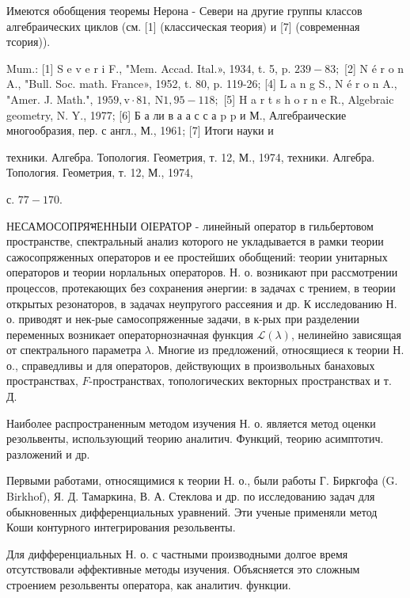 \documentclass[10pt]{article}
\begin{document}
Имеются обобщения теоремы Нерона - Севери на другие группы классов алгебраических циклов (см. [1] (классическая теория) и [7] (современная тсория)).



Mum.: [1] S e v e r i F., "Mem. Accad. Ital.», 1934, t. 5, p. $239-83 ;$ [2] N é r o n A., "Bull. Soc. math. France», 1952, t. 80, p. 119-26; [4] L a n g S., N é r o n A., "Amer. J. Math.", $1959, \mathrm{v} \cdot 81, \mathrm{~N} 1,95-118 ;$ [5] H a r t s h o r n e R., Algebraic geometry, N. Y., 1977; [6] Б а ли в а а с с а p p и М., Алгебраические многообразия, пер. с англ., М., 1961; [7] Итоги науки и

техники. Алгебра. Топология. Геометрия, т. 12, М., 1974, техники. Алгебра. Топология. Геометрия, т. 12, М., 1974,

с. $77-170$.



НЕСАМОСОПРЯभЕННЫИ ОІЕРАТОР - линейный оператор в гильбертовом пространстве, спектральный анализ которого не укладывается в рамки теории сажосопряженных операторов и ее простейших обобщений: теории унитарных операторов и теории норлальных операторов. Н. о. возникают при рассмотрении процессов, протекающих без сохранения әнергии: в задачах с трением, в теории открытых резонаторов, в задачах неупругого рассеяния и др. К исследованию Н. о. приводят и нек-рые самосопряженные задачи, в к-рых при разделении переменных возникает операторнозначная функция $\mathscr{L}(\lambda)$, нелинейно зависящая от спектрального параметра $\lambda$. Многие из предложений, относящиеся к теории Н. о., справедливы и для операторов, действующих в произвольных банаховых пространствах, $F$-пространствах, топологических векторных пространствах и т. Д.



Наиболее распространенным методом изучения Н. о. является метод оценки резольвенты, использующий теорию аналитич. Функций, теорию асимптотич. разложений и др.



Первыми работами, относящимися к теории Н. о., были работы Г. Биркгофа (G. Birkhof), Я. Д. Тамаркина, В. А. Стеклова и др. по исследованию задач для обыкновенных дифференциальных уравнений. Эти ученые применяли метод Коши контурного интегрирования резольвенты.



Для дифференциальных Н. о. с частными производными долгое время отсутствовали әффективные методы изучения. Объясняется это сложным строением резольвенты оператора, как аналитич. функции.
\end{document}
